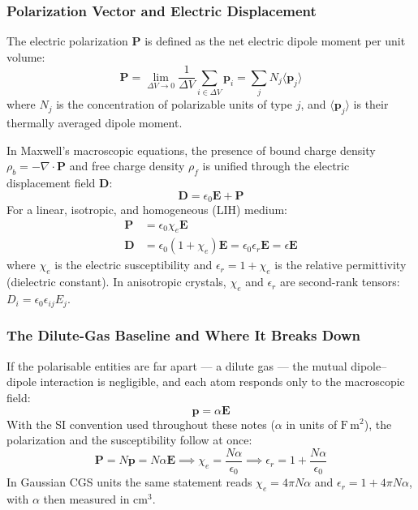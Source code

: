 \documentclass[11pt,a4paper]{article}
\begin{document}
\subsubsection{Polarization Vector and Electric Displacement}
The electric polarization $\mathbf{P}$ is defined as the net electric dipole moment per unit volume:
\begin{equation}
    \mathbf{P} = \lim_{\Delta V \to 0} \frac{1}{\Delta V} \sum_{i \in \Delta V} \mathbf{p}_i = \sum_j N_j \langle \mathbf{p}_j \rangle
\end{equation}
where $N_j$ is the concentration of polarizable units of type $j$, and $\langle \mathbf{p}_j \rangle$ is their thermally averaged dipole moment.

In Maxwell's macroscopic equations, the presence of bound charge density $\rho_b = -\nabla \cdot \mathbf{P}$ and free charge density $\rho_f$ is unified through the electric displacement field $\mathbf{D}$:
\begin{equation}
    \mathbf{D} = \epsilon_0 \mathbf{E} + \mathbf{P}
\end{equation}
For a linear, isotropic, and homogeneous (LIH) medium:
\begin{align}
    \mathbf{P} &= \epsilon_0 \chi_e \mathbf{E} \\
    \mathbf{D} &= \epsilon_0 (1 + \chi_e) \mathbf{E} = \epsilon_0 \epsilon_r \mathbf{E} = \epsilon \mathbf{E}
\end{align}
where $\chi_e$ is the electric susceptibility and $\epsilon_r = 1 + \chi_e$ is the relative permittivity (dielectric constant). In anisotropic crystals, $\chi_e$ and $\epsilon_r$ are second-rank tensors: $D_i = \epsilon_0 \epsilon_{ij} E_j$.

\subsubsection{The Dilute-Gas Baseline and Where It Breaks Down}
If the polarisable entities are far apart --- a dilute gas --- the mutual dipole--dipole interaction is negligible, and each atom responds only to the macroscopic field:
\begin{equation}
    \mathbf{p} = \alpha \mathbf{E}
\end{equation}
With the SI convention used throughout these notes ($\alpha$ in units of $\mathrm{F\,m^2}$), the polarization and the susceptibility follow at once:
\begin{equation}
    \mathbf{P} = N\mathbf{p} = N\alpha\mathbf{E} \implies \chi_e = \frac{N\alpha}{\epsilon_0} \implies \epsilon_r = 1 + \frac{N\alpha}{\epsilon_0}
\end{equation}
In Gaussian CGS units the same statement reads $\chi_e = 4\pi N\alpha$ and $\epsilon_r = 1 + 4\pi N\alpha$, with $\alpha$ then measured in $\mathrm{cm^3}$.
\end{document}

